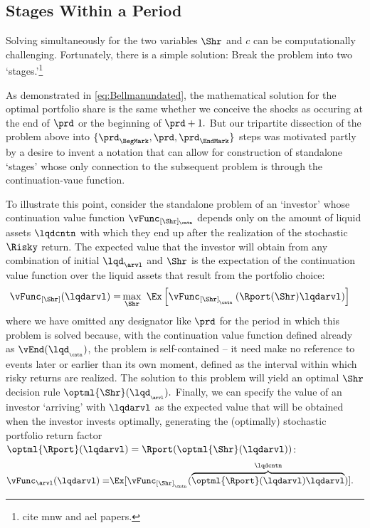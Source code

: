 \documentclass[\econtexRoot/SolvingMicroDSOPs]{subfiles}
\begin{document}
\hypertarget{stages-within-a-period}{}
\subsection{Stages Within a Period}\label{subsec:stageswithin}


Solving simultaneously for the two variables $\Shr$ and ${c}$ can be computationally challenging.  Fortunately, there is a simple solution: Break the problem into two `stages.'\footnote{cite mnw and ael papers.}

As demonstrated in \eqref{eq:Bellmanundated}, the mathematical solution for the optimal portfolio share is the same whether we conceive the shocks as occuring at the end of $\prd$ or the beginning of $\prd+1.$  But our tripartite dissection of the problem above into $\{\prd_{\BegMark},\prd,\prd_{\EndMark}\}$ steps was motivated partly by a desire to invent a notation that can allow for construction of standalone `stages' whose only connection to the subsequent problem is through the continuation-vaue function.

To illustrate this point, consider the standalone problem of an `investor' whose continuation value function $\vFunc_{[\Shr]_\cntn}$ depends only on the amount of liquid assets $\lqdcntn$ with which they end up after the realization of the stochastic $\Risky$ return.  The expected value that the investor will obtain from any combination of initial $\lqd_{\arvl}$ and $\Shr$ is the expectation of the continuation value function over the liquid assets that result from the portfolio choice:
\begin{equation}\begin{gathered}\begin{aligned}
      \vFunc_{[\Shr]}({\lqdarvl})
      = & \max_{\Shr}~ \Ex\left[        \vFunc_{[\Shr]_{_\cntn}}\left(\Rport(\Shr){\lqdarvl}        \right)
      \right] \label{eq:vMidStgShr}
    \end{aligned}\end{gathered}\end{equation}
where we have omitted any designator like $\prd$ for the period in which this problem is solved because, with the continuation value function defined already as $\vEnd({\lqd}_{_\cntn})$, the problem is self-contained -- it need make no reference to events later or earlier than its own moment, defined as the interval within which risky returns are realized.  The solution to this problem will yield an optimal $\Shr$ decision rule $\optml{\Shr}(\lqd_{_\arvl}).$  Finally, we can specify the value of an investor `arriving' with $\lqdarvl$ as the expected value that will be obtained when the investor invests optimally, generating the (optimally) stochastic portfolio return factor $\optml{\Rport}(\lqdarvl)=\Rport(\optml{\Shr}(\lqdarvl))$:
\begin{equation}\begin{gathered}\begin{aligned}
      \vFunc_{\arvl}({\lqdarvl})  = & \Ex[\vFunc_{[\Shr]_{_\cntn}}(\overbrace{
        \optml{\Rport}(\lqdarvl){\lqdarvl}}^{\lqdcntn})].
    \end{aligned}\end{gathered}\end{equation}
\end{document}
